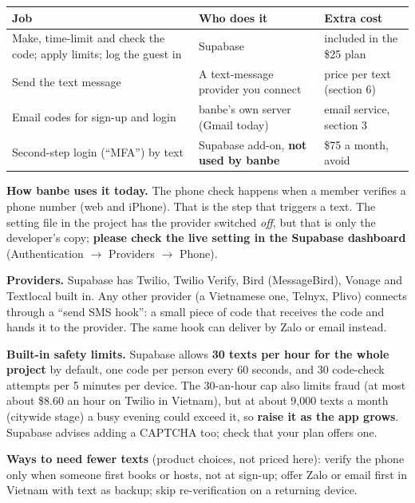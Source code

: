 \documentclass[11pt,a4paper]{article}
\begin{document}
\begin{tabular}{@{}p{58mm}p{52mm}p{46mm}@{}}
\toprule
\textbf{Job} & \textbf{Who does it} & \textbf{Extra cost} \\
\midrule
Make, time-limit and check the code; apply limits; log the guest in & Supabase & included in the \$25 plan \\
Send the text message & A text-message provider you connect & price per text (section 6) \\
Email codes for sign-up and login & banbe's own server (Gmail today) & email service, section 3 \\
Second-step login (``MFA'') by text & Supabase add-on, \textbf{not used by banbe} & \$75 a month, avoid \\
\bottomrule
\end{tabular}

\vspace{6pt}
\textbf{How banbe uses it today.} The phone check happens when a member verifies a phone number (web and iPhone). That is the step that triggers a text. The setting file in the project has the provider switched \emph{off}, but that is only the developer's copy; \textbf{please check the live setting in the Supabase dashboard} (Authentication $\rightarrow$ Providers $\rightarrow$ Phone).

\textbf{Providers.} Supabase has Twilio, Twilio Verify, Bird (MessageBird), Vonage and Textlocal built in. Any other provider (a Vietnamese one, Telnyx, Plivo) connects through a ``send SMS hook'': a small piece of code that receives the code and hands it to the provider. The same hook can deliver by Zalo or email instead.

\textbf{Built-in safety limits.} Supabase allows \textbf{30 texts per hour for the whole project} by default, one code per person every 60 seconds, and 30 code-check attempts per 5 minutes per device. The 30-an-hour cap also limits fraud (at most about \$8.60 an hour on Twilio in Vietnam), but at about 9,000 texts a month (citywide stage) a busy evening could exceed it, so \textbf{raise it as the app grows}. Supabase advises adding a CAPTCHA too; check that your plan offers one.

\begin{tcolorbox}[colback=gold!14,colframe=gold!14]
\textbf{Ways to need fewer texts} (product choices, not priced here): verify the phone only when someone first books or hosts, not at sign-up; offer Zalo or email first in Vietnam with text as backup; skip re-verification on a returning device.
\end{tcolorbox}
\end{document}
